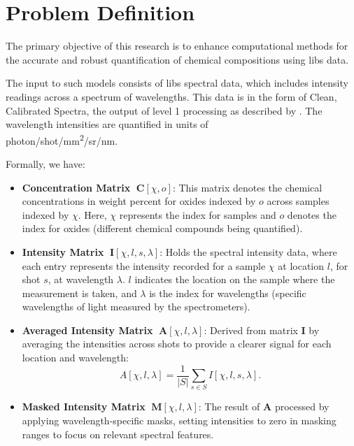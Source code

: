 \section{Problem Definition}\label{sec:problem_definition}
The primary objective of this research is to enhance computational methods for the accurate and robust quantification of chemical compositions using \gls{libs} data.

The input to such models consists of \gls{libs} spectral data, which includes intensity readings across a spectrum of wavelengths. This data is in the form of Clean, Calibrated Spectra\cite{andersonImprovedAccuracyQuantitative2017}, the output of level 1 processing as described by \citet{wiensPreflightCalibrationInitial2013}. The wavelength intensities are quantified in units of \\ photon/shot/mm\textsuperscript{2}/sr/nm.

Formally, we have:
\begin{itemize}[topsep=0pt]
    \item \textbf{Concentration Matrix} $\;\mathbf{C}[\chi, o]$: This matrix denotes the chemical concentrations in weight percent for oxides indexed by $o$ across samples indexed by $\chi$. Here, $\chi$ represents the index for samples and $o$ denotes the index for oxides (different chemical compounds being quantified).
    \label{matrix:concentration}

    \item \textbf{Intensity Matrix} $\;\mathbf{I}[\chi, l, s, \lambda]$: Holds the spectral intensity data, where each entry represents the intensity recorded for a sample $\chi$ at location $l$, for shot $s$, at wavelength $\lambda$. $l$ indicates the location on the sample where the measurement is taken, and $\lambda$ is the index for wavelengths (specific wavelengths of light measured by the spectrometers).
    \label{matrix:intensity}

    \item \textbf{Averaged Intensity Matrix} $\;\mathbf{A}[\chi, l, \lambda]$: Derived from matrix $\mathbf{I}$ by averaging the intensities across shots to provide a clearer signal for each location and wavelength:
    \[
    A[\chi, l, \lambda] = \frac{1}{|S|} \sum_{s \in S} I[\chi, l, s, \lambda].
    \]
    \label{matrix:averaged_intensity}

    \item \textbf{Masked Intensity Matrix} $\;\mathbf{M}[\chi, l, \lambda]$: The result of $\mathbf{A}$ processed by applying wavelength-specific masks, setting intensities to zero in masking ranges to focus on relevant spectral features.
    \label{matrix:masked_intensity}
\end{itemize}

